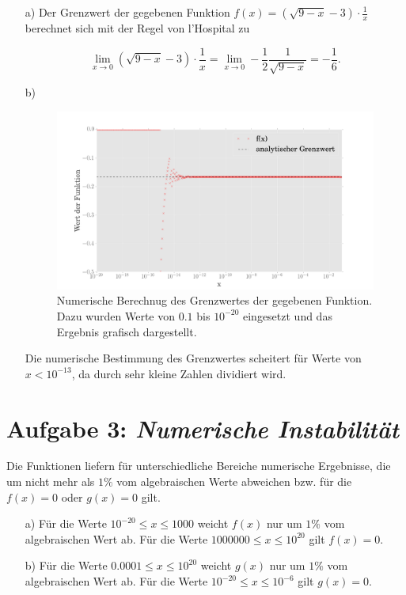 \begin{itemize}
\item[a)] Der Grenzwert der gegebenen Funktion $f(x) = (\sqrt{9-x}-3)\cdot\frac{1}{x} $ berechnet sich mit der Regel von l'Hospital zu 


\begin{equation*}
\lim_{x\to0} (\sqrt{9-x}-3)\cdot\frac{1}{x} = \lim_{x\to0} -\frac{1}{2}\frac{1}{\sqrt{9-x}} = -\frac{1}{6}.
\end{equation*}

\item[b)] \begin{figure}
\centering
\includegraphics[width=\textwidth]{plot2.png}
\caption{Numerische Berechnug des Grenzwertes der gegebenen Funktion. Dazu wurden Werte von $0.1$ bis $10^{-20}$ eingesetzt und das Ergebnis grafisch dargestellt.}
\end{figure}
Die numerische Bestimmung des Grenzwertes scheitert für Werte von $x<10^{-13}$, da durch sehr kleine Zahlen dividiert wird.
\end{itemize}

\section*{Aufgabe 3: \emph{Numerische Instabilität}}

Die Funktionen liefern für unterschiedliche Bereiche numerische Ergebnisse, die um nicht mehr als $1\%$ vom algebraischen Werte abweichen bzw. für die $f(x)=0$ oder $g(x)=0$ gilt.

\begin{itemize}

\item[a)] Für die Werte $10^{-20}\leq x \leq 1000$ weicht $f(x)$ nur um $1\%$ vom algebraischen Wert ab.\newline\newline
Für die Werte $1000000\leq x \leq 10^{20}$ gilt $f(x)=0$.

\item[b)] Für die Werte $0.0001\leq x \leq 10^{20}$ weicht $g(x)$ nur um $1\%$ vom algebraischen Wert ab.\newline\newline
Für die Werte $10^{-20} \leq x \leq 10^{-6}$ gilt $g(x)=0$.

\end{itemize}

